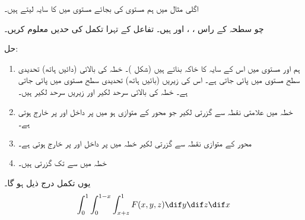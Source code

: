 اگلی مثال میں ہم  مستوی  کی بجائے مستوی  میں  کا سایہ لیتے ہیں۔

چو سطحہ   کے راس ، ،  اور  ہیں۔ تفاعل  کے تہرا تکمل کی حدیں معلوم کریں۔

حل:\quad
\begin{enumerate}[1.]
\item
{}\quad
ہم  اور مستوی  میں اس کے  سایہ  کا خاکہ بناتے ہیں (شکل )۔ خطہ  کی بالائی (دائیں ہاتھ)  تحدیدی سطح    مستوی  میں پائی جاتی ہے۔ اس کی زیریں (بائیں ہاتھ) تحدیدی سطح مستوی  میں پائی جاتی ہے۔ خطہ  کی بالائی  سرحد لکیر   اور زیریں سرحد لکیر  ہیں۔
\item
{}\quad
خطہ  میں علامتی نقطہ   سے گزرتی لکیر  جو محور  کے متوازی ہو  میں  پر داخل اور  پر خارج ہوتی ہے۔
\item
{}\quad
محور  کے متوازی نقطہ  سے گزرتی لکیر  خطہ   میں  پر داخل اور  پر خارج ہوتی ہے۔
\item
{}\quad
خطہ  میں   سے  تک  گزرتی ہیں۔
\end{enumerate}
یوں تکمل درج ذیل ہو گا۔
\begin{align*}
\int_0^1\int_0^{1-x}\int_{x+z}^1F(x,y,z)\dif y\dif z\dif x
\end{align*}
